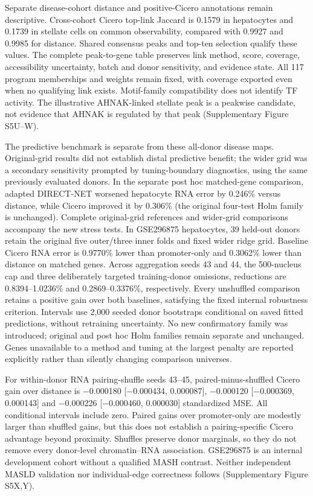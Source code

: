 Separate disease-cohort distance and positive-Cicero annotations remain
descriptive. Cross-cohort Cicero top-link Jaccard is 0.1579 in hepatocytes and
0.1739 in stellate cells on common observability, compared with 0.9927 and
0.9985 for distance. Shared consensus peaks and top-ten selection qualify these
values. The complete peak-to-gene table preserves link method, score, coverage,
accessibility uncertainty, batch and donor sensitivity, and evidence state.
All 117 program memberships and weights remain fixed, with coverage exported
even when no qualifying link exists. Motif-family compatibility does not identify
TF activity. The illustrative AHNAK-linked stellate peak is a peakwise candidate,
not evidence that AHNAK is regulated by that peak (Supplementary Figure S5U--W).

The predictive benchmark is separate from these all-donor disease maps.
Original-grid results did not establish distal predictive benefit; the wider
grid was a secondary sensitivity prompted by tuning-boundary diagnostics, using
the same previously evaluated donors. In the separate post hoc matched-gene
comparison, adapted DIRECT-NET worsened hepatocyte RNA error by 0.246\% versus
distance, while Cicero improved it by 0.306\% (the original four-test Holm family
is unchanged). Complete original-grid references and wider-grid comparisons
accompany the new stress tests. In
GSE296875 hepatocytes, 39 held-out donors retain the original five outer/three
inner folds and fixed wider ridge grid. Baseline Cicero RNA error is 0.9770\%
lower than promoter-only and 0.3062\% lower than distance on matched genes.
Across aggregation seeds 43 and 44, the 500-nucleus cap and three deliberately
targeted training-donor omissions, reductions are 0.8394--1.0236\% and
0.2869--0.3376\%, respectively. Every unshuffled comparison retains a positive
gain over both baselines, satisfying the fixed internal robustness criterion.
Intervals use 2,000 seeded donor bootstraps conditional on saved fitted
predictions, without retraining uncertainty. No new confirmatory family was
introduced; original and post hoc Holm families remain separate and unchanged.
Genes unavailable to a method and tuning at the largest penalty are reported
explicitly rather than silently changing comparison universes.

For within-donor RNA pairing-shuffle seeds 43--45, paired-minus-shuffled Cicero
gain over distance is −0.000180 {[}−0.000434, 0.000087{]}, −0.000120
{[}−0.000369, 0.000143{]} and −0.000226 {[}−0.000460, 0.000030{]} standardized MSE.
All conditional intervals include zero. Paired gains over promoter-only are
modestly larger than shuffled gains, but this does not establish a pairing-specific
Cicero advantage beyond proximity. Shuffles preserve donor marginals, so they do
not remove every donor-level chromatin--RNA association. GSE296875 is an internal
development cohort without a qualified MASH contrast. Neither independent MASLD
validation nor individual-edge correctness follows (Supplementary Figure S5X,Y).

